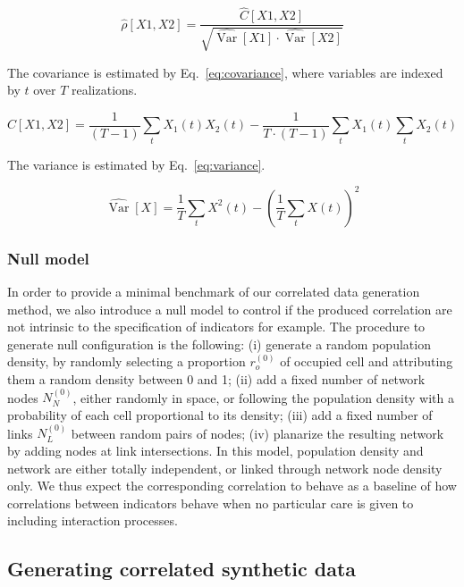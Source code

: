 \documentclass{bmcart}
\DeclareMathOperator{\Var}{Var}
\begin{document}
\begin{equation}
\label{eq:correstimate}
\hat{\rho}[X1,X2] = \frac{\hat{C}[X1,X2]}{\sqrt{\hat{\Var{}}[X1] \cdot \hat{\Var{}}[X2]}}
\end{equation}

The covariance is estimated by Eq.~\ref{eq:covariance}, where variables are indexed by $t$ over $T$ realizations.

\begin{equation}
\label{eq:covariance}
\hat{C}[X1,X2] = \frac{1}{(T-1)}\sum_{t} X_1(t)X_2(t) - \frac{1}{T\cdot (T-1)} \sum_t X_1(t) \sum_t X_2(t)
\end{equation}

The variance is estimated by Eq.~\ref{eq:variance}.

\begin{equation}
\label{eq:variance}
\hat{\Var{}}[X] = \frac{1}{T}\sum_t{X^2(t)}-\left(\frac{1}{T}\sum_tX(t)\right)^2
\end{equation}

 


\subsubsection*{Null model}

In order to provide a minimal benchmark of our correlated data generation method, we also introduce a null model to control if the produced correlation are not intrinsic to the specification of indicators for example. The procedure to generate null configuration is the following: (i) generate a random population density, by randomly selecting a proportion $r_o^{(0)}$ of occupied cell and attributing them a random density between 0 and 1; (ii) add a fixed number of network nodes $N_N^{(0)}$, either randomly in space, or following the population density with a probability of each cell proportional to its density; (iii) add a fixed number of links $N_L^{(0)}$ between random pairs of nodes; (iv) planarize the resulting network by adding nodes at link intersections. In this model, population density and network are either totally independent, or linked through network node density only. We thus expect the corresponding correlation to behave as a baseline of how correlations between indicators behave when no particular care is given to including interaction processes.



\subsection*{Generating correlated synthetic data}
\end{document}
